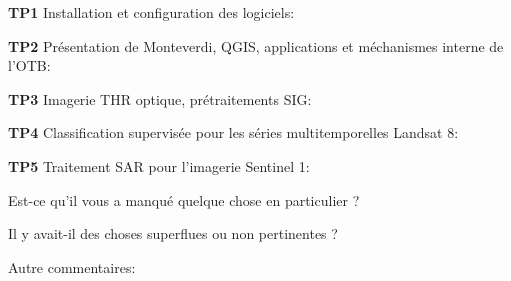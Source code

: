 \documentclass[10pt,a4paper]{article}
\begin{document}
\textbf{TP1} Installation et configuration des logiciels:
\moduleanswer

\textbf{TP2} Présentation de Monteverdi, QGIS, applications et méchanismes interne de l'OTB:
\moduleanswer

\textbf{TP3} Imagerie THR optique, prétraitements SIG:
\moduleanswer

\textbf{TP4} Classification supervisée pour les séries multitemporelles Landsat 8:
\moduleanswer

\textbf{TP5} Traitement SAR pour l'imagerie Sentinel 1:
\moduleanswer

Est-ce qu'il vous a manqué quelque chose en particulier ?
\vspace{6em}

Il y avait-il des choses superflues ou non pertinentes ?
\vspace{6em}

Autre commentaires:
\end{document}
